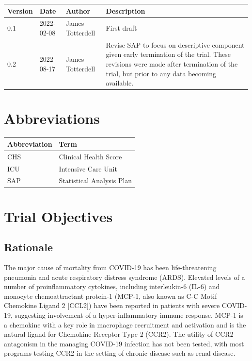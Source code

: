\documentclass[11pt,parskip=half-]{scrartcl}
\begin{document}
\begin{table}[H]
    \begin{center}
        \begin{tabular}{lllp{6cm}}
            \hline
            Version & Date       & Author           & Description \\
            \hline
            0.1     & 2022-02-08 & James Totterdell & First draft \\
            0.2     & 2022-08-17 & James Totterdell & Revise SAP to focus on descriptive component given early termination of the trial. These revisions were made after termination of the trial, but prior to any data becoming available. \\
            \hline
        \end{tabular}
    \end{center}
\end{table}

\section*{Abbreviations}

\begin{table}[H]
    \begin{center}
        \begin{tabular}{ll}
            \hline 
            Abbreviation & Term \\
            \hline 
            CHS & Clinical Health Score \\
            ICU & Intensive Care Unit \\
            SAP & Statistical Analysis Plan \\
            \hline
        \end{tabular}
    \end{center}
\end{table}

\clearpage

\section{Trial Objectives}

\subsection{Rationale}
The major cause of mortality from COVID-19 has been life-threatening pneumonia and acute respiratory distress syndrome (ARDS). Elevated levels of a number of proinflammatory cytokines, including interleukin-6 (IL-6) and monocyte chemoattractant protein-1 (MCP-1, also known as C-C Motif Chemokine Ligand 2 [CCL2]) have been reported in patients with severe COVID-19, suggesting involvement of a hyper-inflammatory immune response. MCP-1 is a chemokine with a key role in macrophage recruitment and activation and is the natural ligand for Chemokine Receptor Type 2 (CCR2). The utility of CCR2 antagonism in the managing COVID-19 infection has not been tested, with most programs testing CCR2 in the setting of chronic disease such as renal disease.
\end{document}
